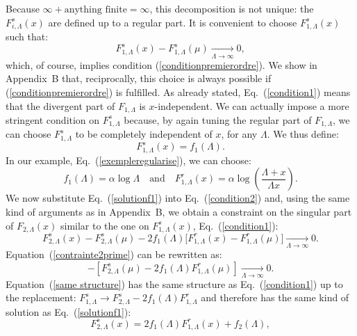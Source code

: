 \documentclass[floatfix,twocolumn,preprintnumbers,amsmath,amssymb,prb]{revtex4}
\begin{document}
Because $\infty + \mbox{anything finite} = \infty$,
this decomposition is not unique: the $F_{i,\Lambda}^{s}(x)$ are
defined up to a regular part. It is convenient to choose
$F_{1,\Lambda}^s(x)$ such that:
\begin{equation}
F_{1,\Lambda}^{s}(x)-F_{1,\Lambda}^{s}(\mu)
\underset{\Lambda\to\infty}{\longrightarrow} 0,
\label{condition1}
\end{equation}
which, of course, implies condition (\ref{conditionpremierordre}).
We show in Appendix~B that, reciprocally, this
choice is always possible if (\ref{conditionpremierordre}) is
fulfilled.  As already stated,
Eq.~(\ref{condition1}) means that the divergent part of
$F_{1,\Lambda}$ is $x$-independent. We can actually impose
a more stringent condition on $F_{1,\Lambda}^{s}$ because, by again
tuning the regular part of $F_{1,\Lambda}$, we can choose
$F_{1,\Lambda}^s$ to be completely independent of $x$, for any
$\Lambda$. We thus define:
\begin{equation}
F_{1,\Lambda}^s(x)=f_1(\Lambda).
\label{solutionf1}
\end{equation}
In our example, Eq.~(\ref{exempleregularise}), we can choose:
\begin{equation}
f_1(\Lambda)=\alpha \log \Lambda\quad \mbox{and}\quad
F_{1,\Lambda}^r(x)= \alpha \log (\frac{\Lambda+x}{\Lambda
x}).
\label{solfisfir}
\end{equation}
We now substitute Eq.~(\ref{solutionf1}) into
Eq.~(\ref{condition2}) and, using the same kind of arguments as in
Appendix~B, we obtain a constraint on the singular part of
$F_{2,\Lambda}(x)$ similar to the one on $F_{1,\Lambda}^{s}(x)$,
Eq.~(\ref{condition1}):
\begin{equation}
F_{2,\Lambda}^s(x) -F_{2,\Lambda}^s(\mu) - 2 f_1(\Lambda)
\big[F_{1,\Lambda}^r(x)
-F_{1,\Lambda}^r(\mu)\big]\underset{\Lambda\to\infty}
{\longrightarrow} 0.
\label{contrainte2prime}
\end{equation}
Equation~(\ref{contrainte2prime}) can be rewritten as:
\begin{equation}
[F_{2,\Lambda}^s(x)- 2 f_1(\Lambda) F_{1,\Lambda}^r(x)]
- [F_{2,\Lambda}^s(\mu)- 2 f_1(\Lambda)
F_{1,\Lambda}^r(\mu)]
\underset{\Lambda\to\infty}{\longrightarrow} 0.
\label{same structure}
\end{equation}
Equation~(\ref{same structure}) has the same structure as
Eq.~(\ref{condition1}) up to the replacement: $F_{1,\Lambda}^s\to
F_{2,\Lambda}^s- 2 f_1(\Lambda) F_{1,\Lambda}^r$ and therefore
has the same kind of solution as Eq.~(\ref{solutionf1}):
\begin{equation}
F_{2,\Lambda}^s(x) = 2 f_1(\Lambda) F_{1,\Lambda}^r(x) +
f_2(\Lambda),
\label{last}
\end{equation}
\end{document}
